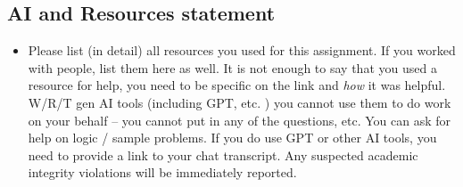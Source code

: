 \documentclass[
]{article}
\providecommand{\tightlist}{%
  \setlength{\itemsep}{0pt}\setlength{\parskip}{0pt}}
\begin{document}
\subsection{AI and Resources
statement}\label{ai-and-resources-statement}

\begin{itemize}
\tightlist
\item
  Please list (in detail) all resources you used for this assignment. If
  you worked with people, list them here as well. It is not enough to
  say that you used a resource for help, you need to be specific on the
  link and \emph{how} it was helpful. W/R/T gen AI tools (including GPT,
  etc. ) you cannot use them to do work on your behalf -- you cannot put
  in any of the questions, etc. You can ask for help on logic / sample
  problems. If you do use GPT or other AI tools, you need to provide a
  link to your chat transcript. Any suspected academic integrity
  violations will be immediately reported.
\end{itemize}
\end{document}
